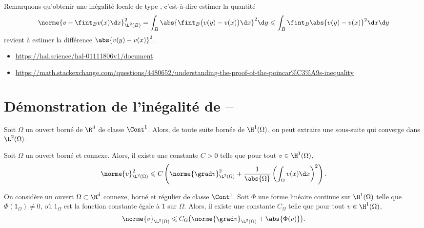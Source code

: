 \begin{remarque}
Remarquons qu'obtenir une inégalité locale de type , c'est-à-dire estimer la quantité
\[
\norme{v - \fint_B v(x) \d x}^2_{\L^2(B)} = \int_B \abs{\fint_B \big(v(y) - v(x)\big) \d x}^2 \d y \leqslant \int_B \fint_B \abs{v(y) - v(x)}^2 \d x \d y
\]
revient à estimer la différence $\abs{v(y) - v(x)}^2$. 
\end{remarque}

\begin{envide}[Sources]
\begin{itemize}
    \item \url{https://hal.science/hal-01111806v1/document}
    \item \url{https://math.stackexchange.com/questions/4480652/understanding-the-proof-of-the-poincar%C3%A9s-inequality}
\end{itemize}
\end{envide}

\section{Démonstration de l'inégalité de --}\label{annexeWirtinger}

\begin{theo}
    Soit $\Omega$ un ouvert borné de $\R^d$ de classe $\Cont^1$. Alors, de toute suite bornée de $\H^1(\Omega)$, on peut extraire une sous-suite qui converge dans $\L^2(\Omega)$. 
\end{theo}

\begin{theo}
    Soit $\Omega$ un ouvert borné et connexe. Alors, il existe une constante $C > 0$ telle que pour tout $v \in \H^1(\Omega)$,
    \[
    \norme{v}^2_{\L^2(\Omega)} \leqslant C \left( \norme{\grad v}^2_{\L^2(\Omega)} + \frac{1}{\abs{\Omega}} \left( \int_\Omega v(x) \d x \right)^2 \right).
    \]
\end{theo}

\begin{lemme}
    On considère un ouvert $\Omega \subset \R^d$ connexe, borné et régulier de classe $\Cont^1$. Soit $\Phi$ une forme linéaire continue sur $\H^1(\Omega)$ telle que $\Phi(1_\Omega) \not= 0$, où $1_\Omega$ est la fonction constante égale à $1$ sur $\Omega$. Alors, il existe une constante $C_\Omega$ telle que pour tout $v \in \H^1(\Omega)$,
    \[
    \norme{v}_{\L^2(\Omega)} \leqslant C_\Omega \big( \norme{\grad v}_{\L^2(\Omega)} + \abs{\Phi(v)} \big). 
    \]
\end{lemme}

